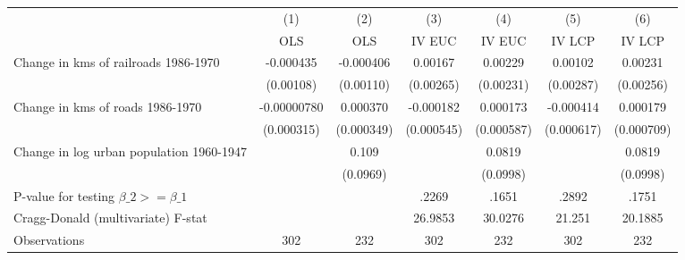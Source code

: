 {
\def\sym#1{\ifmmode^{#1}\else\(^{#1}\)\fi}
\begin{tabular}{l*{6}{c}}
\hline\hline
                &\multicolumn{1}{c}{(1)}&\multicolumn{1}{c}{(2)}&\multicolumn{1}{c}{(3)}&\multicolumn{1}{c}{(4)}&\multicolumn{1}{c}{(5)}&\multicolumn{1}{c}{(6)}\\
                &\multicolumn{1}{c}{OLS}&\multicolumn{1}{c}{OLS}&\multicolumn{1}{c}{IV EUC}&\multicolumn{1}{c}{IV EUC}&\multicolumn{1}{c}{IV LCP}&\multicolumn{1}{c}{IV LCP}\\
\hline
Change in kms of railroads 1986-1970&-0.000435         &-0.000406         &  0.00167         &  0.00229         &  0.00102         &  0.00231         \\
                &(0.00108)         &(0.00110)         &(0.00265)         &(0.00231)         &(0.00287)         &(0.00256)         \\
[1em]
Change in kms of roads 1986-1970&-0.00000780         & 0.000370         &-0.000182         & 0.000173         &-0.000414         & 0.000179         \\
                &(0.000315)         &(0.000349)         &(0.000545)         &(0.000587)         &(0.000617)         &(0.000709)         \\
[1em]
Change in log urban population 1960-1947&                  &    0.109         &                  &   0.0819         &                  &   0.0819         \\
                &                  & (0.0969)         &                  & (0.0998)         &                  & (0.0998)         \\
\hline
P-value for testing $\beta\_{2} >= \beta\_{1}$&                  &                  &    .2269         &    .1651         &    .2892         &    .1751         \\
Cragg-Donald (multivariate) F-stat&                  &                  &  26.9853         &  30.0276         &   21.251         &  20.1885         \\
Observations    &      302         &      232         &      302         &      232         &      302         &      232         \\
\hline\hline
\end{tabular}
}
